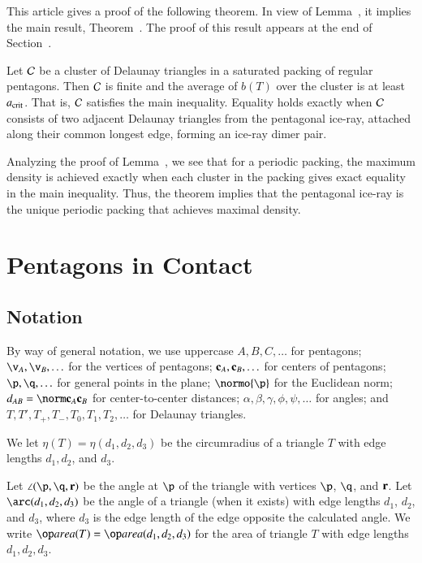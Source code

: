 This article gives a proof of the following theorem. In view of
Lemma~, it implies the main result,
Theorem~.  The proof of this result appears at the end
of Section~.

\begin{theorem}
  Let $\mathcal C$ be a cluster of Delaunay triangles in a saturated packing
  of regular pentagons.  Then $\mathcal C$ is finite and the average of $b(T)$
  over the cluster is at least $a_\text{crit}$.  That is, $\mathcal C$ satisfies the
  main inequality.  Equality holds exactly when $\mathcal C$ consists of two
  adjacent Delaunay triangles from the pentagonal ice-ray, attached
  along their common longest edge, forming an ice-ray dimer pair.
\end{theorem}

\begin{remark}
Analyzing the proof of Lemma~, we see that for a
periodic packing, the maximum density is achieved exactly when each
 cluster in the packing gives exact equality in the main inequality.
Thus, the theorem implies that the pentagonal ice-ray  is the
unique periodic packing that achieves maximal density.
\end{remark}



\section{Pentagons in Contact}


\subsection{Notation}

By way of general notation, we use uppercase $A,B,C,\ldots$ for
pentagons; $\v_A,\v_B,\ldots$ for the vertices of pentagons;
${\mathbf c}_A,{\mathbf c}_B,\ldots$ for centers of pentagons; $\p,\q,\ldots$ for
general points in the plane; $\normo{\p}$ for the Euclidean norm;
$\dx{AB}=\dd{A}{B}$ for center-to-center distances;
$\alpha,\beta,\gamma,\phi,\psi,\ldots$ for angles; and
$T,T',T_+,T_-,T_0,T_1,T_2,\ldots$ for Delaunay triangles.

We let $\eta(T) = \eta(d_1,d_2,d_3)$ be the circumradius of a triangle
$T$ with edge lengths $d_1,d_2$, and $d_3$.

Let $\angle(\p,\q,\r)$ be the angle at $\p$ of the triangle with
vertices $\p$, $\q$, and ${\mathbf r}$.  Let $\arc(d_1,d_2,d_3)$ be the angle
of a triangle (when it exists) with edge lengths $d_1$, $d_2$, and
$d_3$, where $d_3$ is the edge length of the edge opposite the
calculated angle.  We write $\area(T)= \area(d_1,d_2,d_3)$ for the
area of triangle $T$ with edge lengths $d_1,d_2,d_3$.


